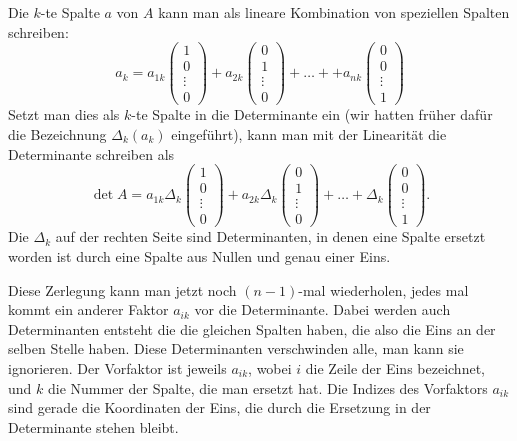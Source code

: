 Die $k$-te Spalte $a$ von $A$ kann man als lineare Kombination von
speziellen Spalten schreiben:
\[
a_k=a_{1k}
\begin{pmatrix}
1\\0\\\vdots\\0
\end{pmatrix}
+a_{2k}
\begin{pmatrix}
0\\1\\\vdots\\0
\end{pmatrix}
+\dots+
+a_{nk}
\begin{pmatrix}
0\\0\\\vdots\\1
\end{pmatrix}
\]
Setzt man dies als $k$-te Spalte in die Determinante ein (wir hatten früher
dafür die Bezeichnung $\Delta_k(a_k)$ eingeführt), kann man mit
der Linearität  die Determinante schreiben als
\[
\det A=a_{1k}\Delta_k\left(
\begin{matrix}
1\\0\\\vdots\\0
\end{matrix}
\right)
+a_{2k}
\Delta_k\left(
\begin{matrix}
0\\1\\\vdots\\0
\end{matrix}
\right)+\dots+
\Delta_k\left(
\begin{matrix}
0\\0\\\vdots\\1
\end{matrix}
\right).
\]
Die $\Delta_k$ auf der rechten Seite sind Determinanten, in denen 
eine Spalte ersetzt worden ist durch eine Spalte aus Nullen und genau
einer Eins.

Diese Zerlegung kann man jetzt noch $(n-1)$-mal wiederholen,
jedes mal kommt ein anderer Faktor $a_{ik}$ vor die Determinante.
Dabei werden auch Determinanten entsteht die die gleichen Spalten
haben, die also die Eins an der selben Stelle haben.
Diese Determinanten verschwinden alle, man kann sie ignorieren.
Der Vorfaktor ist
jeweils $a_{ik}$, wobei $i$ die Zeile der Eins bezeichnet, und $k$
die Nummer der Spalte, die man ersetzt hat.
Die Indizes des
Vorfaktors $a_{ik}$ sind gerade die Koordinaten der Eins, die durch
die Ersetzung in der Determinante stehen bleibt.

